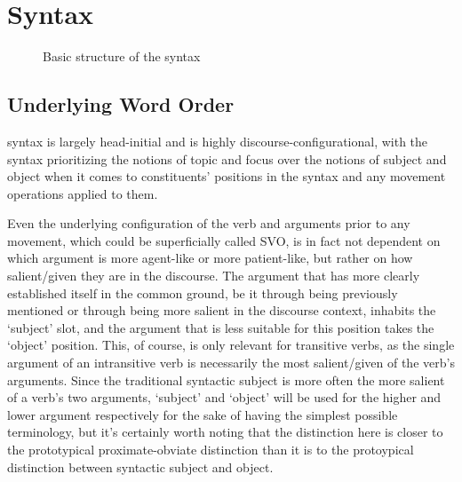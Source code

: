 \documentclass[a4paper,11pt,oneside,openany]{memoir}
\begin{document}
\chapter{Syntax}

\begin{figure}[htb]
    \centering
    \caption{Basic structure of the \parentlang{} syntax}
    \label{fig:syntaxtree}
\end{figure}

\section{Underlying Word Order}

\parentlang{} syntax is largely head-initial and is highly discourse-configurational, with the syntax prioritizing the notions of topic and focus over the notions of subject and object when it comes to constituents' positions in the syntax and any movement operations applied to them. 

Even the underlying configuration of the verb and arguments prior to any movement, which could be superficially called SVO, is in fact not dependent on which argument is more agent-like or more patient-like, but rather on how salient/given they are in the discourse. The argument that has more clearly established itself in the common ground, be it through being previously mentioned or through being more salient in the discourse context, inhabits the `subject' slot, and the argument that is less suitable for this position takes the `object' position. This, of course, is only relevant for transitive verbs, as the single argument of an intransitive verb is necessarily the most salient/given of the verb's arguments. Since the traditional syntactic subject is more often the more salient of a verb's two arguments, `subject' and `object' will be used for the higher and lower argument respectively for the sake of having the simplest possible terminology, but it's certainly worth noting that the distinction here is closer to the prototypical proximate-obviate distinction than it is to the protoypical distinction between syntactic subject and object.
\end{document}
